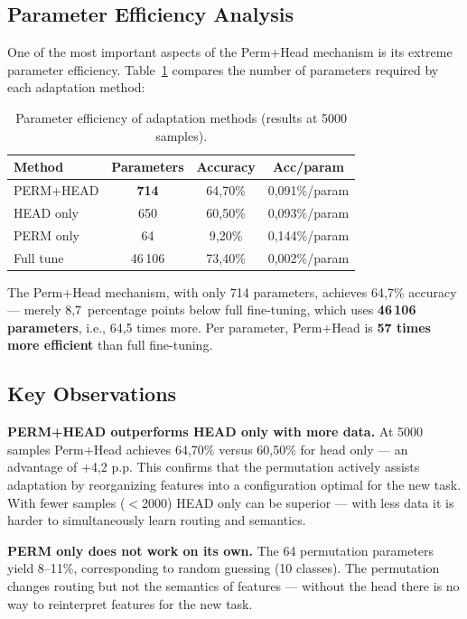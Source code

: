 \documentclass[11pt,a4paper]{report}
\begin{document}
\subsection{Parameter Efficiency Analysis}

One of the most important aspects of the Perm+Head mechanism is its extreme parameter efficiency. Table~\ref{tab:param_efficiency} compares the number of parameters required by each adaptation method:

\begin{table}[htbp]
\centering
\caption{Parameter efficiency of adaptation methods (results at 5000 samples).}
\label{tab:param_efficiency}
\begin{tabular}{l|c|c|c}
\hline
\textbf{Method} & \textbf{Parameters} & \textbf{Accuracy} & \textbf{Acc/param} \\
\hline
PERM+HEAD  & \textbf{714}   & 64{,}70\% & 0{,}091\%/param \\
HEAD only  & 650   & 60{,}50\% & 0{,}093\%/param \\
PERM only  & 64    & 9{,}20\%  & 0{,}144\%/param \\
Full tune  & 46\,106 & 73{,}40\% & 0{,}002\%/param \\
\hline
\end{tabular}
\end{table}

The Perm+Head mechanism, with only 714 parameters, achieves 64{,}7\% accuracy --- merely 8{,}7~percentage points below full fine-tuning, which uses \textbf{46\,106 parameters}, i.e., 64{,}5 times more. Per parameter, Perm+Head is \textbf{57 times more efficient} than full fine-tuning.

\subsection{Key Observations}

\textbf{PERM+HEAD outperforms HEAD only with more data.} At 5000 samples Perm+Head achieves 64{,}70\% versus 60{,}50\% for head only --- an advantage of +4{,}2 p.p. This confirms that the permutation actively assists adaptation by reorganizing features into a configuration optimal for the new task. With fewer samples ($<$2000) HEAD only can be superior --- with less data it is harder to simultaneously learn routing and semantics.

\textbf{PERM only does not work on its own.} The 64 permutation parameters yield 8--11\%, corresponding to random guessing (10 classes). The permutation changes routing but not the semantics of features --- without the head there is no way to reinterpret features for the new task.
\end{document}
